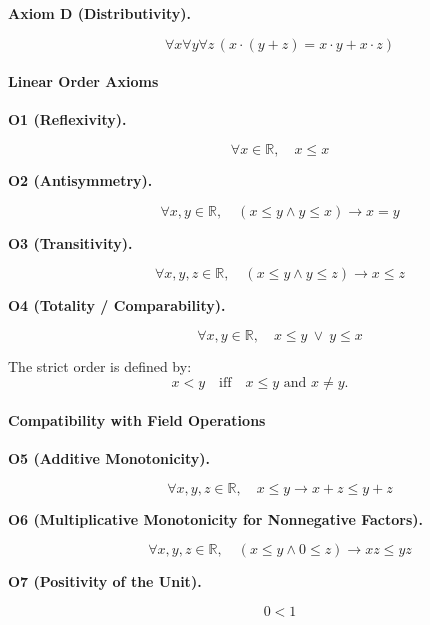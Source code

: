 \begin{description}

\item[\textbf{Axiom D (Distributivity).}]
\[
\forall x \forall y \forall z \, (x\cdot (y+z) = x\cdot y + x\cdot z)
\]

\end{description}


\paragraph{Linear Order Axioms}

\begin{description}

\item[\textbf{O1 (Reflexivity).}]
\[
\forall x\in\mathbb{R},\quad x \le x
\]

\item[\textbf{O2 (Antisymmetry).}]
\[
\forall x,y\in\mathbb{R},\quad
(x \le y \wedge y \le x) \rightarrow x = y
\]

\item[\textbf{O3 (Transitivity).}]
\[
\forall x,y,z\in\mathbb{R},\quad
(x \le y \wedge y \le z) \rightarrow x \le z
\]

\item[\textbf{O4 (Totality / Comparability).}]
\[
\forall x,y\in\mathbb{R},\quad
x \le y \ \vee\ y \le x
\]

\end{description}

\begin{exposition}
The strict order is defined by:
\[
x < y
\quad\text{iff}\quad
x \le y \text{ and } x \neq y.
\]
\end{exposition}

\paragraph{Compatibility with Field Operations}

\begin{description}

\item[\textbf{O5 (Additive Monotonicity).}]
\[
\forall x,y,z\in\mathbb{R},\quad
x \le y \rightarrow x+z \le y+z
\]

\item[\textbf{O6 (Multiplicative Monotonicity for Nonnegative Factors).}]
\[
\forall x,y,z\in\mathbb{R},\quad
(x \le y \wedge 0 \le z) \rightarrow xz \le yz
\]

\item[\textbf{O7 (Positivity of the Unit).}]
\[
0 < 1
\]

\end{description}


